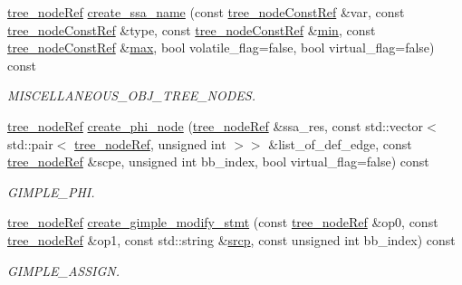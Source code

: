 \begin{DoxyCompactItemize}
\hyperlink{tree__node_8hpp_a6ee377554d1c4871ad66a337eaa67fd5}{tree\+\_\+node\+Ref} \hyperlink{classtree__manipulation_a690ffa0d5f4e3c3aaaa38742b1ca0912}{create\+\_\+ssa\+\_\+name} (const \hyperlink{tree__node_8hpp_a3cf5d02292c940f3892425a5b5fdec3c}{tree\+\_\+node\+Const\+Ref} \&var, const \hyperlink{tree__node_8hpp_a3cf5d02292c940f3892425a5b5fdec3c}{tree\+\_\+node\+Const\+Ref} \&type, const \hyperlink{tree__node_8hpp_a3cf5d02292c940f3892425a5b5fdec3c}{tree\+\_\+node\+Const\+Ref} \&\hyperlink{tutorial__pact__2019_2Introduction_2sixth_2qsort_8c_abb702d8b501669a23aa0ab3b281b9384}{min}, const \hyperlink{tree__node_8hpp_a3cf5d02292c940f3892425a5b5fdec3c}{tree\+\_\+node\+Const\+Ref} \&\hyperlink{tutorial__pact__2019_2Target-Customization_2first_2hint_8c_a28f422940797ea297699ba55d89171c5}{max}, bool volatile\+\_\+flag=false, bool virtual\+\_\+flag=false) const
\begin{DoxyCompactList}\small\item\em M\+I\+S\+C\+E\+L\+L\+A\+N\+E\+O\+U\+S\+\_\+\+O\+B\+J\+\_\+\+T\+R\+E\+E\+\_\+\+N\+O\+D\+ES. \end{DoxyCompactList}\item 
\hyperlink{tree__node_8hpp_a6ee377554d1c4871ad66a337eaa67fd5}{tree\+\_\+node\+Ref} \hyperlink{classtree__manipulation_a6106305b8de3d51daede502c7fbfb540}{create\+\_\+phi\+\_\+node} (\hyperlink{tree__node_8hpp_a6ee377554d1c4871ad66a337eaa67fd5}{tree\+\_\+node\+Ref} \&ssa\+\_\+res, const std\+::vector$<$ std\+::pair$<$ \hyperlink{tree__node_8hpp_a6ee377554d1c4871ad66a337eaa67fd5}{tree\+\_\+node\+Ref}, unsigned int $>$$>$ \&list\+\_\+of\+\_\+def\+\_\+edge, const \hyperlink{tree__node_8hpp_a6ee377554d1c4871ad66a337eaa67fd5}{tree\+\_\+node\+Ref} \&scpe, unsigned int bb\+\_\+index, bool virtual\+\_\+flag=false) const
\begin{DoxyCompactList}\small\item\em G\+I\+M\+P\+L\+E\+\_\+\+P\+HI. \end{DoxyCompactList}\item 
\hyperlink{tree__node_8hpp_a6ee377554d1c4871ad66a337eaa67fd5}{tree\+\_\+node\+Ref} \hyperlink{classtree__manipulation_adf4268da561eaa877bde497ff5e7b839}{create\+\_\+gimple\+\_\+modify\+\_\+stmt} (const \hyperlink{tree__node_8hpp_a6ee377554d1c4871ad66a337eaa67fd5}{tree\+\_\+node\+Ref} \&op0, const \hyperlink{tree__node_8hpp_a6ee377554d1c4871ad66a337eaa67fd5}{tree\+\_\+node\+Ref} \&op1, const std\+::string \&\hyperlink{structsrcp}{srcp}, const unsigned int bb\+\_\+index) const
\begin{DoxyCompactList}\small\item\em G\+I\+M\+P\+L\+E\+\_\+\+A\+S\+S\+I\+GN. \end{DoxyCompactList}\item 
$$
\end{DoxyCompactItemize}
